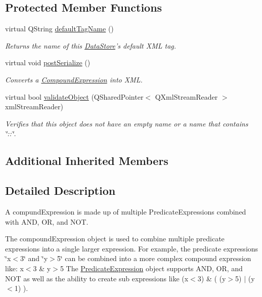 \subsection*{Protected Member Functions}
\begin{DoxyCompactItemize}
\item 
virtual Q\-String \hyperlink{class_picto_1_1_compound_expression_a494e82e75fc2bde09d7ae6e6987065f2}{default\-Tag\-Name} ()
\begin{DoxyCompactList}\small\item\em Returns the name of this \hyperlink{class_picto_1_1_data_store}{Data\-Store}'s default X\-M\-L tag. \end{DoxyCompactList}\item 
virtual void \hyperlink{class_picto_1_1_compound_expression_a135fb968c2d88783aea74acf14eeb500}{post\-Serialize} ()
\begin{DoxyCompactList}\small\item\em Converts a \hyperlink{class_picto_1_1_compound_expression}{Compound\-Expression} into X\-M\-L. \end{DoxyCompactList}\item 
\hypertarget{class_picto_1_1_compound_expression_a2d52af5fa101b25fc8b86c87ed02f1f2}{virtual bool \hyperlink{class_picto_1_1_compound_expression_a2d52af5fa101b25fc8b86c87ed02f1f2}{validate\-Object} (Q\-Shared\-Pointer$<$ Q\-Xml\-Stream\-Reader $>$ xml\-Stream\-Reader)}\label{class_picto_1_1_compound_expression_a2d52af5fa101b25fc8b86c87ed02f1f2}

\begin{DoxyCompactList}\small\item\em Verifies that this object does not have an empty name or a name that contains \char`\"{}\-::\char`\"{}. \end{DoxyCompactList}\end{DoxyCompactItemize}
\subsection*{Additional Inherited Members}


\subsection{Detailed Description}
A compund\-Expression is made up of multiple Predicate\-Expressions combined with A\-N\-D, O\-R, and N\-O\-T. 

The compound\-Expression object is used to combine multiple predicate expressions into a single larger expression. For example, the predicate expressions \char`\"{}x$<$3\char`\"{} and \char`\"{}y$>$5\char`\"{} can be combined into a more complex compound expression like\-: x$<$3 \& y$>$5 The \hyperlink{class_picto_1_1_predicate_expression}{Predicate\-Expression} object supports A\-N\-D, O\-R, and N\-O\-T as well as the ability to create sub expressions like (x$<$3) \& ( (y$>$5) $|$ (y$<$1) ).

